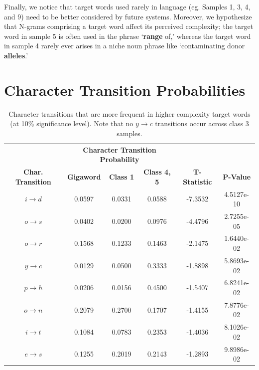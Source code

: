 \documentclass{dcthesis}
\theoremstyle{definition}
\theoremstyle{remark}
\begin{document}
Finally, we notice that target words used rarely in language (eg. Samples 1, 3, 4, and 9) need to be better considered by future systems. Moreover, we hypothesize that N-grams comprising a target word affect its perceived complexity; the target word in sample 5 is often used in the phrase \lq{\textbf{range} of,}\rq{} whereas the target word in sample 4 rarely ever arises in a niche noun phrase like \lq{contaminating donor \textbf{alleles}.}\rq{} 

\section{Character Transition Probabilities}

\begin{table}
  \centering
  \begin{tabular}{c|ccc|cc}
    \toprule
    \centering
    & \multicolumn{3}{c|}{\textbf{Character Transition Probability}} &  &  \\
    \textbf{Char. Transition} & \textbf{Gigaword} & \textbf{Class 1} & \textbf{Class 4, 5} & \textbf{T-Statistic} & \textbf{P-Value}  \\
    \midrule
    $i \rightarrow d$ & 0.0597 & 0.0331 &  0.0588 &    -7.3532 &  4.5127e-10 \\
    $o \rightarrow s$ & 0.0402 & 0.0200 &  0.0976 &    -4.4796 &  2.7255e-05 \\
    $o \rightarrow r$ & 0.1568 & 0.1233 &  0.1463 &    -2.1475 &  1.6440e-02 \\
    $y \rightarrow c$ & 0.0129 & 0.0500 &  0.3333 &    -1.8898 &  5.8693e-02 \\
    $p \rightarrow h$ & 0.0206 & 0.0156 &  0.4500 &    -1.5407 &  6.8241e-02 \\
    $o \rightarrow n$ & 0.2079 & 0.2700 &  0.1707 &    -1.4155 &  7.8776e-02 \\
    $i \rightarrow t$ & 0.1084 & 0.0783 &  0.2353 &    -1.4036 &  8.1026e-02 \\
    $e \rightarrow s$ & 0.1255 & 0.2019 &  0.2143 &    -1.2893 &  9.8986e-02 \\
    \bottomrule
  \end{tabular}
  \caption{\label{tab:top_char_transitions} Character transitions that are more frequent in higher complexity target words (at 10\% significance level). Note that no $y \rightarrow c$ transitions occur across class 3 samples.}
\end{table}
\end{document}

